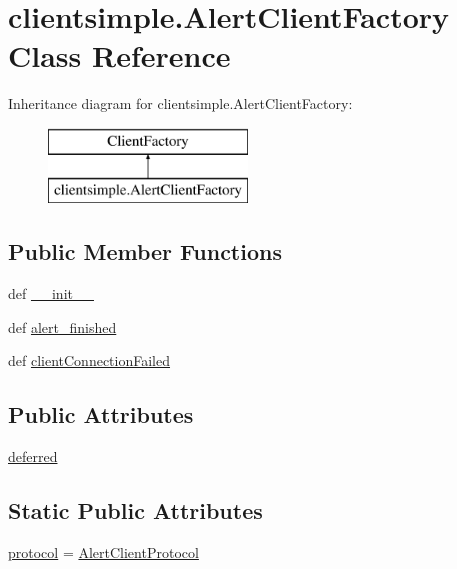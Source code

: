 \hypertarget{classclientsimple_1_1_alert_client_factory}{\section{clientsimple.\-Alert\-Client\-Factory Class Reference}
\label{classclientsimple_1_1_alert_client_factory}
}
Inheritance diagram for clientsimple.\-Alert\-Client\-Factory\-:\begin{figure}[H]
\begin{center}
\leavevmode
\includegraphics[height=2.000000cm]{classclientsimple_1_1_alert_client_factory}
\end{center}
\end{figure}
\subsection*{Public Member Functions}
\begin{DoxyCompactItemize}
\item 
def \hyperlink{classclientsimple_1_1_alert_client_factory_abb581e29db4327caa7a1ca6d50b656a9}{\-\_\-\-\_\-init\-\_\-\-\_\-}
\item 
def \hyperlink{classclientsimple_1_1_alert_client_factory_a0741a76118880556daa6a7a1c810b9fb}{alert\-\_\-finished}
\item 
def \hyperlink{classclientsimple_1_1_alert_client_factory_a140bcc1b6005968f0f8dcc919290fcea}{client\-Connection\-Failed}
\end{DoxyCompactItemize}
\subsection*{Public Attributes}
\begin{DoxyCompactItemize}
\item 
\hyperlink{classclientsimple_1_1_alert_client_factory_a944edc2575a1528d6b5c3b7bfe07906b}{deferred}
\end{DoxyCompactItemize}
\subsection*{Static Public Attributes}
\begin{DoxyCompactItemize}
\item 
\hyperlink{classclientsimple_1_1_alert_client_factory_a8407b6a35b081ae3536cfac79015e780}{protocol} = \hyperlink{classclientsimple_1_1_alert_client_protocol}{Alert\-Client\-Protocol}
\end{DoxyCompactItemize}


